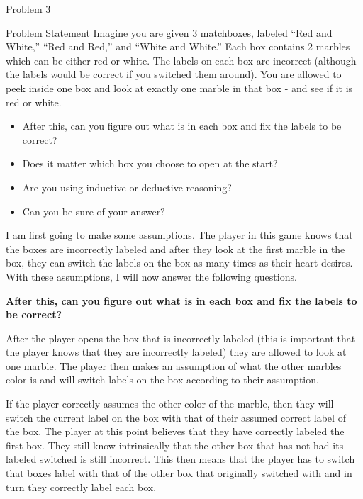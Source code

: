 \begin{problem}{Problem 3}
    \begin{statement}{Problem Statement}
        Imagine you are given 3 matchboxes, labeled “Red and White,” “Red and Red,” and “White and White.” Each box contains 2 marbles which can be either red or white. The labels on each box are 
        incorrect  (although the labels would be correct if you switched them around). You are allowed to peek inside one box and look at exactly one marble in that box - and see if it is red or white.

        \begin{itemize}
            \item After this, can you figure out what is in each box and fix the labels to be correct?
            \item Does it matter which box you choose to open at the start?
            \item Are you using inductive or deductive reasoning?
            \item Can you be sure of your answer?
        \end{itemize}
    \end{statement}
    
    \begin{highlight}[Solution]
        I am first going to make some assumptions. The player in this game knows that the boxes are incorrectly labeled and after they look at the first marble in the box, they can switch the labels on
        the box as many times as their heart desires. With these assumptions, I will now answer the following questions. \vspace*{1em}

        \noindent \textbf{After this, can you figure out what is in each box and fix the labels to be correct?} \vspace*{1em}

        After the player opens the box that is incorrectly labeled (this is important that the player knows that they are incorrectly labeled) they are allowed to look at one marble. The player then makes
        an assumption of what the other marbles color is and will switch labels on the box according to their assumption.

        If the player correctly assumes the other color of the marble, then they will switch the current label on the box with that of their assumed correct label of the box. The player at this point believes
        that they have correctly labeled the first box. They still know intrinsically that the other box that has not had its labeled switched is still incorrect. This then means that the player has to switch 
        that boxes label with that of the other box that originally switched with and in turn they correctly label each box.


\end{highlight}
\end{problem}
